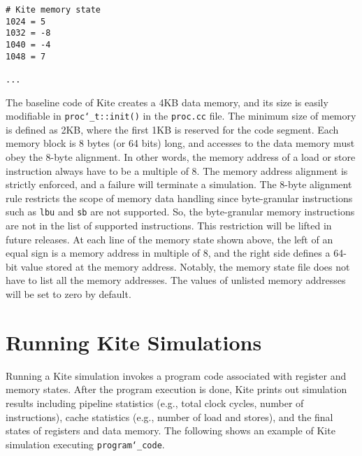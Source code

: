 \documentclass[10pt]{article}
\begin{document}
\begin{Verbatim}[frame=single]
# Kite memory state
1024 = 5
1032 = -8
1040 = -4
1048 = 7

...

\end{Verbatim}

The baseline code of Kite creates a 4KB data memory, and its size is easily modifiable in {\tt proc\char`_t::init()} in the {\tt proc.cc} file.
The minimum size of memory is defined as 2KB, where the first 1KB is reserved for the code segment.
Each memory block is 8 bytes (or 64 bits) long, and accesses to the data memory must obey the 8-byte alignment.
In other words, the memory address of a load or store instruction always have to be a multiple of 8.
The memory address alignment is strictly enforced, and a failure will terminate a simulation.
The 8-byte alignment rule restricts the scope of memory data handling since byte-granular instructions such as {\tt lbu} and {\tt sb} are not supported.
So, the byte-granular memory instructions are not in the list of supported instructions.
This restriction will be lifted in future releases.
At each line of the memory state shown above, the left of an equal sign is a memory address in multiple of 8, and the right side defines a 64-bit value stored at the memory address.
Notably, the memory state file does not have to list all the memory addresses.
The values of unlisted memory addresses will be set to zero by default.


\section{Running Kite Simulations} \label{sec:running}
Running a Kite simulation invokes a program code associated with register and memory states.
After the program execution is done, Kite prints out simulation results including pipeline statistics (e.g., total clock cycles, number of instructions), cache statistics (e.g., number of load and stores), and the final states of registers and data memory.
The following shows an example of Kite simulation executing {\tt program\char`_code}.
\end{document}
